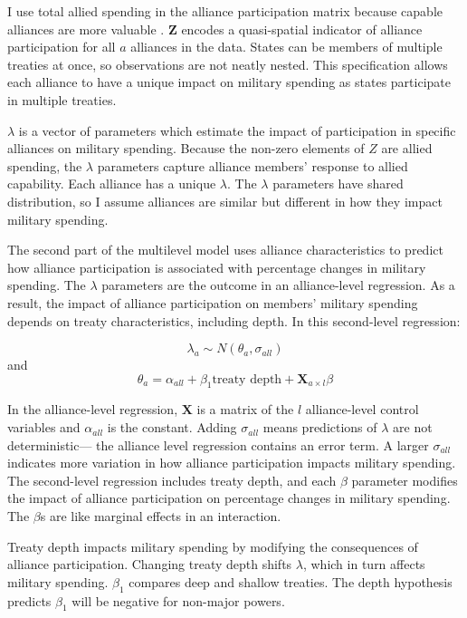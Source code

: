 \documentclass[12pt]{article}
\begin{document}
I use total allied spending in the alliance participation matrix because capable alliances are more valuable \citep{Johnsonetal2015}. 
$\textbf{Z}$ encodes a quasi-spatial indicator of alliance participation for all $a$ alliances in the data. 
States can be members of multiple treaties at once, so observations are not neatly nested. 
This specification allows each alliance to have a unique impact on military spending as states participate in multiple treaties. 


$\lambda$ is a vector of parameters which estimate the impact of participation in specific alliances on military spending. 
Because the non-zero elements of $Z$ are allied spending, the $\lambda$ parameters capture alliance members' response to allied capability. 
Each alliance has a unique $\lambda$. 
The $\lambda$ parameters have shared distribution, so I assume alliances are similar but different in how they impact military spending. 


The second part of the multilevel model uses alliance characteristics to predict how alliance participation is associated with percentage changes in military spending. 
The $\lambda$ parameters are the outcome in an alliance-level regression.
As a result, the impact of alliance participation on members' military spending depends on treaty characteristics, including depth. 
In this second-level regression: 


\begin{equation}
\lambda_{a} \sim N(\theta_{a}, \sigma_{all})
\end{equation} 
and 
\begin{equation}
\theta_{a} = \alpha_{all} + \beta_1 \mbox{treaty depth} + \textbf{X}_{a \times l} \beta
\end{equation}


In the alliance-level regression, $\textbf{X}$ is a matrix of the $l$ alliance-level control variables and $\alpha_{all}$ is the constant.
Adding $\sigma_{all}$ means predictions of $\lambda$ are not deterministic--- the alliance level regression contains an error term. 
A larger $\sigma_{all}$ indicates more variation in how alliance participation impacts military spending. 
The second-level regression includes treaty depth, and each $\beta$ parameter modifies the impact of alliance participation on percentage changes in military spending. 
The $\beta$s are like marginal effects in an interaction. 


Treaty depth impacts military spending by modifying the consequences of alliance participation. 
Changing treaty depth shifts $\lambda$, which in turn affects military spending.
$\beta_1$ compares deep and shallow treaties. 
The depth hypothesis predicts $\beta_1$ will be negative for non-major powers. 
\end{document}
